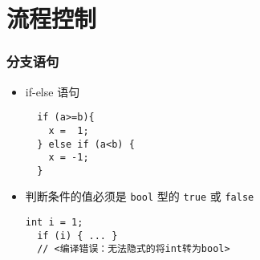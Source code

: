 \section{流程控制}

\begin{frame}[fragile]
\frametitle{分支语句}
  \begin{itemize}
  \item if-else 语句
\begin{lstlisting}
  if (a>=b){
    x =  1;
  } else if (a<b) {
    x = -1;
  }
\end{lstlisting}
    \pause
  \item 判断条件的值必须是 \texttt{bool} 型的 \texttt{true} 或 \texttt{false}
\begin{lstlisting}[escapeinside=<>]
  int i = 1;
  if (i) { ... }
  // <编译错误：无法隐式的将int转为bool>
\end{lstlisting}
  \end{itemize}
\end{frame}

